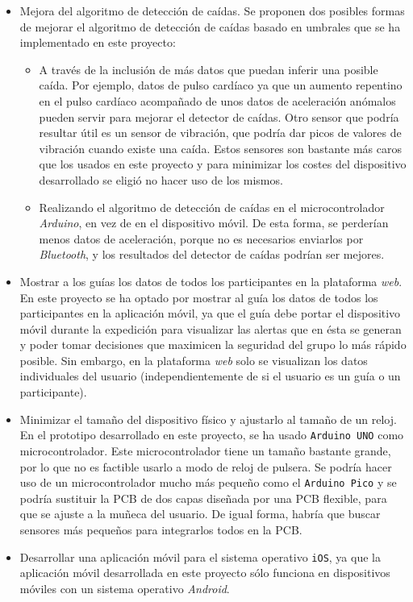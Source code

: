 \begin{itemize}
\item Mejora del algoritmo de detección de caídas. Se proponen dos posibles formas de mejorar el algoritmo de detección de caídas basado en umbrales que se ha implementado en este proyecto:
\begin{itemize}
\item A través de la inclusión de más datos que puedan inferir una posible caída. Por ejemplo, datos de pulso cardíaco ya que un aumento repentino en el pulso cardíaco acompañado de unos datos de aceleración anómalos pueden servir para mejorar el detector de caídas. Otro sensor que podría resultar útil es un sensor de vibración, que podría dar picos de valores de vibración cuando existe una caída. Estos sensores son bastante más caros que los usados en este proyecto y para minimizar los costes del dispositivo desarrollado se eligió no hacer uso de los mismos.
\item Realizando el algoritmo de detección de caídas en el microcontrolador \textit{Arduino}, en vez de en el dispositivo móvil. De esta forma, se perderían menos datos de aceleración, porque no es necesarios enviarlos por \textit{Bluetooth}, y los resultados del detector de caídas podrían ser mejores.
\end{itemize}

\item Mostrar a los guías los datos de todos los participantes en la plataforma \textit{web}. En este proyecto se ha optado por mostrar al guía los datos de todos los participantes en la aplicación móvil, ya que el guía debe portar el dispositivo móvil durante la expedición para visualizar las alertas que en ésta se generan y poder tomar decisiones que maximicen la seguridad del grupo lo más rápido posible. Sin embargo, en la plataforma \textit{web} solo se visualizan los datos individuales del usuario (independientemente de si el usuario es un guía o un participante).

\item Minimizar el tamaño del dispositivo físico y ajustarlo al tamaño de un reloj. En el prototipo desarrollado en este proyecto, se ha usado \texttt{Arduino UNO} como microcontrolador. Este microcontrolador tiene un tamaño bastante grande, por lo que no es factible usarlo a modo de reloj de pulsera. Se podría hacer uso de un microcontrolador mucho más pequeño como el \texttt{Arduino Pico} y se podría sustituir la \ac{PCB} de dos capas diseñada por una \ac{PCB} flexible, para que se ajuste a la muñeca del usuario. De igual forma, habría que buscar sensores más pequeños para integrarlos todos en la \ac{PCB}.

\item Desarrollar una aplicación móvil para el sistema operativo \texttt{iOS}, ya que la aplicación móvil desarrollada en este proyecto sólo funciona en dispositivos móviles con un sistema operativo \textit{Android}.
\end{itemize}

